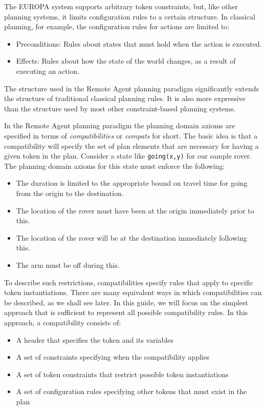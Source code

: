 The EUROPA system supports arbitrary token constraints, but, like
other planning systems, it limits configuration rules to a certain
structure.  In classical planning, for example, the configuration
rules for actions are limited to:
  \begin{itemize}
  \item Preconditions: Rules about states that must hold when the
action is executed.
  \item Effects: Rules about how the state of the world changes, as a
result of executing an action.
  \end{itemize}
  The structure used in the Remote Agent planning paradigm
significantly extends the structure of traditional classical planning
rules.  It is also more expressive than the structure used by most
other constraint-based planning systems.

In the Remote Agent planning paradigm the planning domain axioms are
specified in terms of {\em compatibilities} or {\em compats} for
short.  The basic idea is that a compatibility will specify the set of
plan elements that are necessary for having a given token in the plan. 
Consider a state like {\tt going(x,y)} for our sample rover.  The
planning domain axioms for this state must enforce the following:
  \begin{itemize}
  \item The duration is limited to the appropriate bound on travel
time for going from the origin to the destination.
  \item The location of the rover must have been at the origin
immediately prior to this.
  \item The location of the rover will be at the destination
immediately following this.
  \item The arm must be off during this.
  \end{itemize}

To describe such restrictions, compatibilities specify rules that
apply to specific token instantiations.  There are many equivalent 
ways in which compatibilities can be described, as we shall see 
later.  In this guide, we will focus on the simplest approach that is 
sufficient to represent all possible compatibility rules.  In this 
approach, a compatibility consists of:
  \begin{itemize}
  \item A header that specifies the token and its variables
  \item A set of constraints specifying when the compatibility applies
  \item A set of token constraints that restrict possible 
  token instantiations
  \item A set of configuration rules specifying other tokens that 
  must exist in the plan
  \end{itemize}

